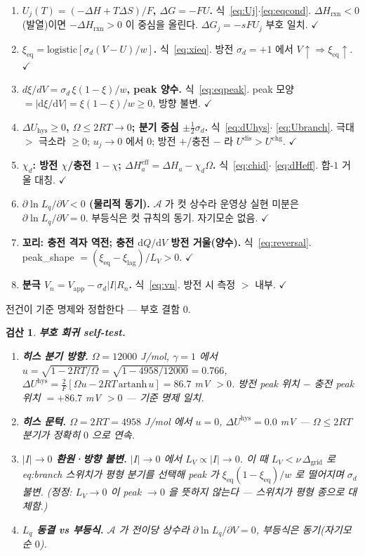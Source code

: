 \documentclass[11pt,a4paper]{article}
\newtheorem*{verifybox}{검산}
\newcommand{\dd}{\mathrm{d}}
\newcommand{\eff}{\mathrm{eff}}
\newcommand{\eq}{\mathrm{eq}}
\newcommand{\app}{\mathrm{app}}
\newcommand{\rxn}{\mathrm{rxn}}
\newcommand{\dis}{\mathrm{dis}}
\newcommand{\chg}{\mathrm{chg}}
\newcommand{\hys}{\mathrm{hys}}
\begin{document}
\begin{enumerate}[label=\textbf{S\arabic*.},leftmargin=2.6em,itemsep=2pt]
\item \textbf{$U_j(T)=(-\Delta H+T\Delta S)/F$, $\Delta G=-FU$.} 식~\eqref{eq:Uj}$\cdot$\eqref{eq:eqcond}.
$\Delta H_\rxn<0$(발열)이면 $-\Delta H_\rxn>0$ 이 중심을 올린다. $\Delta G_j=-sFU_j$ 부호 일치. $\checkmark$
\item \textbf{$\xi_\eq=\mathrm{logistic}[\sigma_d(V-U)/w]$.} 식~\eqref{eq:xieq}. 방전 $\sigma_d=+1$ 에서
$V\!\uparrow\Rightarrow\xi_\eq\!\uparrow$. $\checkmark$
\item \textbf{$d\xi/dV=\sigma_d\,\xi(1-\xi)/w$, peak 양수.} 식~\eqref{eq:eqpeak}. peak 모양 $=|\dd\xi/\dd V|=
\xi(1-\xi)/w\ge0$, 방향 불변. $\checkmark$
\item \textbf{$\Delta U_\hys\ge0$, $\Omega\le2RT\to0$; 분기 중심 $\pm\tfrac12\sigma_d$.} 식~\eqref{eq:dUhys}$\cdot$
\eqref{eq:Ubranch}. 극대 $>$ 극소라 $\ge0$; $u_j\to0$ 에서 $0$; 방전 $+$/충전 $-$ 라 $U^\dis>U^\chg$. $\checkmark$
\item \textbf{$\chi_d$: 방전 $\chi$/충전 $1-\chi$; $\Delta H_a^\eff=\Delta H_a-\chi_d\Omega$.} 식~\eqref{eq:chid}$\cdot$
\eqref{eq:dHeff}. 합-$1$ 거울 대칭. $\checkmark$
\item \textbf{$\partial\ln L_q/\partial V<0$ (물리적 동기).} $\mathcal A$ 가 컷 상수라 운영상 실현 미분은
$\partial\ln L_q/\partial V=0$. 부등식은 컷 규칙의 동기. 자기모순 없음. $\checkmark$
\item \textbf{꼬리: 충전 격자 역전; 충전 $\dd Q/\dd V$ 방전 거울(양수).} 식~\eqref{eq:reversal}.
peak\_shape $=(\xi_\eq-\xi_\mathrm{lag})/L_V>0$. $\checkmark$
\item \textbf{분극 $V_n=V_\app-\sigma_d|I|R_n$.} 식~\eqref{eq:vn}. 방전 시 측정 $>$ 내부. $\checkmark$
\end{enumerate}
전건이 기준 명제와 정합한다 — 부호 결함 $0$.

\begin{verifybox}
\textbf{부호 회귀 self-test.}
\begin{enumerate}[label=\textbf{R\arabic*.},leftmargin=2.6em,itemsep=1pt]
\item \textbf{히스 분기 방향.} $\Omega=12000$ J/mol, $\gamma=1$ 에서
$u=\sqrt{1-2RT/\Omega}=\sqrt{1-4958/12000}=0.766$,
$\Delta U^\hys=\frac{2}{F}[\Omega u-2RT\,\mathrm{artanh}\,u]=86.7$ mV $>0$.
방전 peak 위치 $-$ 충전 peak 위치 $= +86.7$ mV $>0$ — 기준 명제 일치.
\item \textbf{히스 문턱.} $\Omega=2RT=4958$ J/mol 에서 $u=0$,
$\Delta U^\hys=0.0$ mV — $\Omega\le2RT$ 분기가 정확히 $0$ 으로 연속.
\item \textbf{$|I|\!\to\!0$ 환원·방향 불변.} $|I|\to0$ 에서 $L_V\propto|I|\to0$.
이 때 $L_V<\nu\,\Delta_\mathrm{grid}$ 로 eq:branch 스위치가 평형 분기를 선택해
peak 가 $\xi_\eq(1-\xi_\eq)/w$ 로 떨어지며 $\sigma_d$ 불변.
(\emph{정정}: $L_V\to0$ 이 peak $\to0$ 을 뜻하지 않는다 — 스위치가 평형 종으로 \emph{대체}함.)
\item \textbf{$L_q$ 동결 vs 부등식.} $\mathcal A$ 가 전이당 상수라 $\partial\ln L_q/\partial V=0$,
부등식은 동기(자기모순 $0$).
\end{enumerate}
\end{verifybox}
\end{document}
